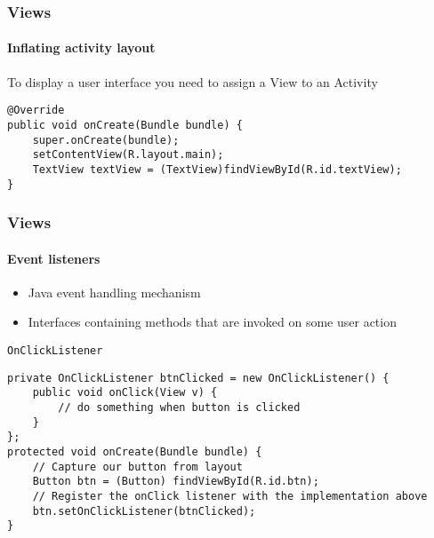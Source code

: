 %
%

\begin{frame}[fragile]
  \frametitle{Views}
  \framesubtitle{Inflating activity layout}

  To display a user interface you need to assign a View to an Activity

\begin{lstlisting}
@Override
public void onCreate(Bundle bundle) {
    super.onCreate(bundle);
    setContentView(R.layout.main);
    TextView textView = (TextView)findViewById(R.id.textView);
}
\end{lstlisting}


\end{frame}


\begin{frame}[fragile]
  \frametitle{Views}
  \framesubtitle{Event listeners}

  \begin{itemize}
  \item<1-> Java event handling mechanism
  \item<2-> Interfaces containing methods that are invoked on some
    user action
  \end{itemize}

  \begin{exampleblock}{\texttt{OnClickListener}}
\begin{lstlisting}
private OnClickListener btnClicked = new OnClickListener() {
    public void onClick(View v) {
        // do something when button is clicked
    }
};
protected void onCreate(Bundle bundle) {
    // Capture our button from layout
    Button btn = (Button) findViewById(R.id.btn);
    // Register the onClick listener with the implementation above
    btn.setOnClickListener(btnClicked);
}
\end{lstlisting}
  \end{exampleblock}

\end{frame}

